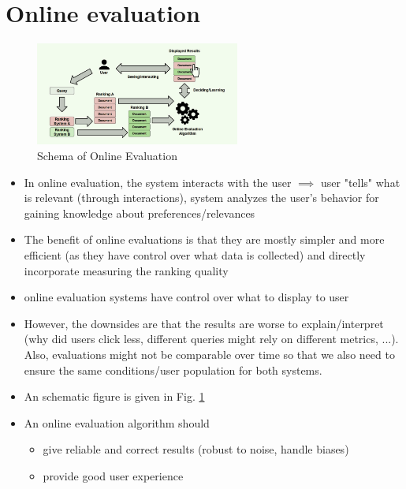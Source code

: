 \section{Online evaluation}
\begin{figure}[ht]
	\centering
	\includegraphics[width=0.6\textwidth]{figures/online_evaluation.png}
	\caption{Schema of Online Evaluation}
	\label{img:online_eval}
\end{figure}
\begin{itemize}
	\item In online evaluation, the system interacts with the user $\implies$ user "tells" what is relevant (through interactions), system analyzes the user's behavior for gaining knowledge about preferences/relevances
	\item The benefit of online evaluations is that they are mostly simpler and more efficient (as they have control over what data is collected) and directly incorporate measuring the ranking quality
	\item online evaluation systems have control over what to display to user
	\item However, the downsides are that the results are worse to explain/interpret (why did users click less, different queries might rely on different metrics, ...). Also, evaluations might not be comparable over time so that we also need to ensure the same conditions/user population for both systems.
	\item An schematic figure is given in Fig. \ref{img:online_eval}
	\item An online evaluation algorithm should
	\begin{itemize}
		\item give reliable and correct results (robust to noise, handle biases)
		\item provide good user experience
	\end{itemize} 
\end{itemize}
